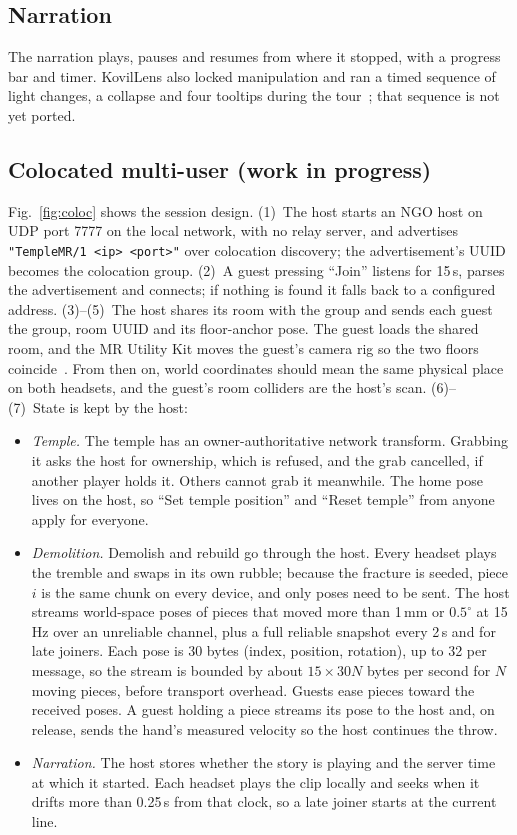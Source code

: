 \documentclass[conference]{IEEEtran}
\begin{document}
\subsection{Narration}
The narration plays, pauses and resumes from where it stopped, with a progress bar and timer. KovilLens also locked manipulation and ran a timed sequence of light changes, a collapse and four tooltips during the tour~\cite{kovillens2025}; that sequence is not yet ported.

\subsection{Colocated multi-user (work in progress)}\label{sec:collab}
Fig.~\ref{fig:coloc} shows the session design.
(1)~The host starts an NGO host on UDP port 7777 on the local network, with no relay server, and advertises \texttt{"TempleMR/1 <ip> <port>"} over colocation discovery; the advertisement's UUID becomes the colocation group.
(2)~A guest pressing ``Join'' listens for 15\,s, parses the advertisement and connects; if nothing is found it falls back to a configured address.
(3)--(5)~The host shares its room with the group and sends each guest the group, room UUID and its floor-anchor pose. The guest loads the shared room, and the MR Utility Kit moves the guest's camera rig so the two floors coincide~\cite{metaspacesharing}. From then on, world coordinates should mean the same physical place on both headsets, and the guest's room colliders are the host's scan.
(6)--(7)~State is kept by the host:
\begin{itemize}
\item \emph{Temple.} The temple has an owner-authoritative network transform. Grabbing it asks the host for ownership, which is refused, and the grab cancelled, if another player holds it. Others cannot grab it meanwhile. The home pose lives on the host, so ``Set temple position'' and ``Reset temple'' from anyone apply for everyone.
\item \emph{Demolition.} Demolish and rebuild go through the host. Every headset plays the tremble and swaps in its own rubble; because the fracture is seeded, piece $i$ is the same chunk on every device, and only poses need to be sent. The host streams world-space poses of pieces that moved more than 1\,mm or $0.5^\circ$ at 15\,Hz over an unreliable channel, plus a full reliable snapshot every 2\,s and for late joiners. Each pose is 30 bytes (index, position, rotation), up to 32 per message, so the stream is bounded by about $15 \times 30N$ bytes per second for $N$ moving pieces, before transport overhead. Guests ease pieces toward the received poses. A guest holding a piece streams its pose to the host and, on release, sends the hand's measured velocity so the host continues the throw.
\item \emph{Narration.} The host stores whether the story is playing and the server time at which it started. Each headset plays the clip locally and seeks when it drifts more than 0.25\,s from that clock, so a late joiner starts at the current line.
\end{itemize}
\end{document}
